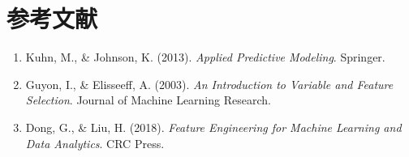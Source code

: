 \documentclass[12pt, a4paper]{article}
\begin{document}
\section{参考文献}
\begin{enumerate}
    \item Kuhn, M., \& Johnson, K. (2013). \textit{Applied Predictive Modeling}. Springer.
    \item Guyon, I., \& Elisseeff, A. (2003). \textit{An Introduction to Variable and Feature Selection}. Journal of Machine Learning Research.
    \item Dong, G., \& Liu, H. (2018). \textit{Feature Engineering for Machine Learning and Data Analytics}. CRC Press.
\end{enumerate}
\end{document}
